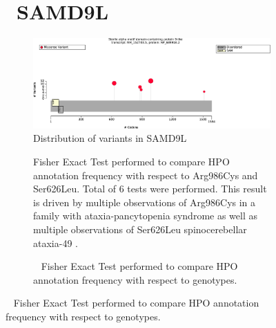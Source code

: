 \begin{figure}[htbp]
\section*{ SAMD9L}
\centering
\begin{subfigure}[b]{0.95\textwidth}
\centering
\includegraphics[width=\textwidth]{ img/SAMD9L_protein_diagram.pdf} 
\captionsetup{justification=raggedright,singlelinecheck=false}
\caption{Distribution of variants in SAMD9L}
\end{subfigure}

\vspace{2em}

\begin{subfigure}[b]{0.95\textwidth}
\centering
{}
\captionsetup{justification=raggedright,singlelinecheck=false}
\caption{Fisher Exact Test performed to compare HPO annotation frequency with respect to Arg986Cys and Ser626Leu. Total of
        6 tests were performed. This result is driven by multiple observations of Arg986Cys in a family with ataxia-pancytopenia syndrome 
        \cite{PMID_28202457} as
        well as  multiple observations of Ser626Leu spinocerebellar ataxia-49 \cite{PMID_35310830}.}
\end{subfigure}
\vspace{2em}
\begin{subfigure}[b]{0.95\textwidth}
\centering
{}
\captionsetup{justification=raggedright,singlelinecheck=false}
\caption{             Fisher Exact Test performed to compare HPO annotation frequency with respect to genotypes. }
\end{subfigure}


\end{figure}
